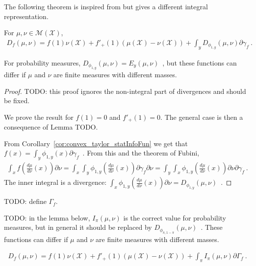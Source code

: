 The following theorem is inspired from \cite{liese2006divergences,liese2012phi} but gives a different integral representation.

\begin{theorem}
  \label{thm:fDiv_eq_integral_eGamma}
  For $\mu, \nu \in \mathcal M(\mathcal X)$,
  \begin{align*}
  D_f(\mu, \nu) = f(1) \nu(\mathcal X) + f'_+(1)(\mu(\mathcal X) - \nu(\mathcal X)) + \int_y D_{\phi_{1,y}}(\mu, \nu) \partial\gamma_f \: .
  \end{align*}
\end{theorem}

For probability measures, $D_{\phi_{1,y}}(\mu, \nu) = E_y(\mu, \nu)$~, but these functions can differ if $\mu$ and $\nu$ are finite measures with different masses.

\begin{proof}%
{}
TODO: this proof ignores the non-integral part of divergences and should be fixed.

We prove the result for $f(1) = 0$ and $f'_+(1) = 0$. The general case is then a consequence of Lemma TODO.

From Corollary~\ref{cor:convex_taylor_statInfoFun} we get that $f(x) = \int_y \phi_{1,y}(x) \partial\gamma_f$~.
From this and the theorem of Fubini,
\begin{align*}
\int_x f\left( \frac{d \mu}{d \nu}(x) \right) \partial\nu
= \int_{x} \int_{y} \phi_{1,y} \left(\frac{d \mu}{d \nu}(x) \right) \partial\gamma_f \partial\nu
= \int_{y} \int_{x} \phi_{1,y} \left(\frac{d \mu}{d \nu}(x) \right) \partial\nu \partial\gamma_f
\: .
\end{align*}
The inner integral is a divergence: $\int_{x} \phi_{1,y} \left(\frac{d \mu}{d \nu}(x) \right) \partial\nu = D_{\phi_{1,y}}(\mu, \nu)$~.
\end{proof}

TODO: define $\Gamma_f$.

TODO: in the lemma below, $I_\pi(\mu, \nu)$ is the correct value for probability measures, but in general it should be replaced by $D_{\phi_{\pi, 1 - \pi}}(\mu, \nu)$~.
These functions can differ if $\mu$ and $\nu$ are finite measures with different masses.

\begin{theorem}
  \label{thm:fDiv_eq_integral}
  \begin{align*}
  D_f(\mu, \nu) = f(1) \nu(\mathcal X) + f'_+(1)(\mu(\mathcal X) - \nu(\mathcal X)) + \int_\pi I_\pi(\mu, \nu) \partial\Gamma_f \: .
  \end{align*}
  
\end{theorem}

